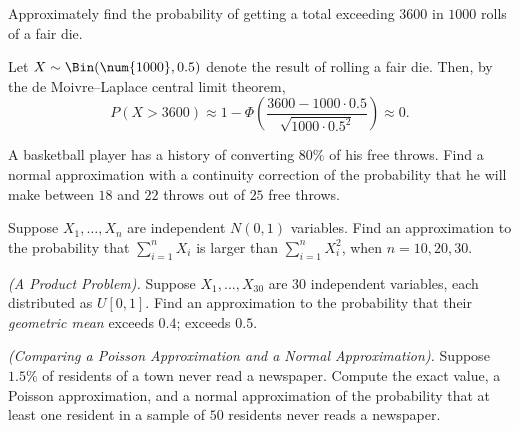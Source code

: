 \begin{problem}[Handout 14, \# 5]
  Approximately find the probability of getting a total exceeding
  \(\num{3600}\) in \(\num{1000}\) rolls of a fair die.
\end{problem}
\begin{solution}
  Let \(X\sim\Bin(\num{1000},0.5)\) denote the result of rolling a
  fair die. Then, by the de Moivre--Laplace central limit theorem,
  \[
    P(X>\num{3600})\approx 1- \Phi\left(\frac{\num{3600}-\num{1000}\cdot
        0.5}{\sqrt{\num{1000}\cdot 0.5^2}}\right)
    \approx 0.
  \]
\end{solution}
\newpage

\begin{problem}[Handout 14, \# 6]
  A basketball player has a history of converting \(80\%\) of his free
  throws. Find a normal approximation with a continuity correction of the
  probability that he will make between \(18\) and \(22\) throws out of
  \(25\) free throws.
\end{problem}
\begin{solution}

\end{solution}
\newpage

\begin{problem}[Handout 14, \# 7]
  Suppose \(X_1,\dotsc,X_n\) are independent \(N(0,1)\) variables. Find an
  approximation to the probability that \(\sum_{i=1}^n X_i\) is larger than
  \(\sum_{i=1}^n X_i^2\), when \(n=10,20,30\).
\end{problem}
\begin{solution}

\end{solution}
\newpage

\begin{problem}[Handout 14, \# 8]
  \emph{(A Product Problem).} Suppose \(X_1,\dotsc,X_{30}\) are \(30\)
  independent variables, each distributed as \(U[0,1]\). Find an
  approximation to the probability that their \emph{geometric mean} exceeds
  \(0.4\); exceeds \(0.5\).
\end{problem}
\begin{solution}

\end{solution}
\newpage

\begin{problem}[Handout 14, \# 9]
  \emph{(Comparing a Poisson Approximation and a Normal Approximation).}
  Suppose \(1.5\%\) of residents of a town never read a newspaper. Compute
  the exact value, a Poisson approximation, and a normal approximation of
  the probability that at least one resident in a sample of \(50\)
  residents never reads a newspaper.
\end{problem}
\begin{solution}

\end{solution}
\newpage

